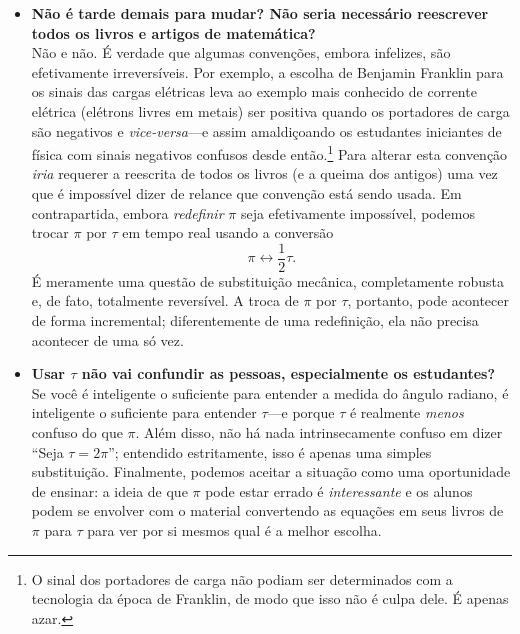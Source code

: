 {\begin{itemize}
  \item \textbf{Não é tarde demais para mudar? Não seria necessário reescrever todos os livros e artigos de matemática?} \\ Não e não. É verdade que algumas convenções, embora infelizes, são efetivamente irreversíveis. Por exemplo, a escolha de Benjamin Franklin para os sinais das cargas elétricas leva ao exemplo mais conhecido de corrente elétrica (elétrons livres em metais) ser positiva quando os portadores de carga são negativos e \emph{vice-versa}---e assim amaldiçoando os estudantes iniciantes de física com sinais negativos confusos desde então.\footnote{O sinal dos portadores de carga não podiam ser determinados com a tecnologia da época de Franklin, de modo que isso não é culpa dele. É apenas azar.} Para alterar esta convenção \emph{iria} requerer a reescrita de todos os livros (e a queima dos antigos) uma vez que é impossível dizer de relance que convenção está sendo usada. Em contrapartida, embora \emph{redefinir} $\pi$ seja efetivamente impossível, podemos trocar $\pi$ por $\tau$ em tempo real usando a conversão \[ \pi \leftrightarrow \textstyle{\frac{1}{2}}\tau. \] É meramente uma questão de substituição mecânica, completamente robusta e, de fato, totalmente reversível. A troca de $\pi$ por $\tau$, portanto, pode acontecer de forma incremental; diferentemente de uma redefinição, ela não precisa acontecer de uma só vez.

  \item \textbf{Usar $\tau$ não vai confundir as pessoas, especialmente os estudantes?} \\ Se você é inteligente o suficiente para entender a medida do ângulo radiano, é inteligente o suficiente para entender $\tau$---e porque $\tau$ é realmente \emph{menos} confuso do que $\pi$. Além disso, não há nada intrinsecamente confuso em dizer ``Seja $\tau = 2\pi$''; entendido estritamente, isso é apenas uma simples substituição. Finalmente, podemos aceitar a situação como uma oportunidade de ensinar: a ideia de que $\pi$ pode estar errado é \emph{interessante} e os alunos podem se envolver com o material convertendo as equações em seus livros de $\pi$ para $\tau$ para ver por si mesmos qual é a melhor escolha.


\end{itemize}}
